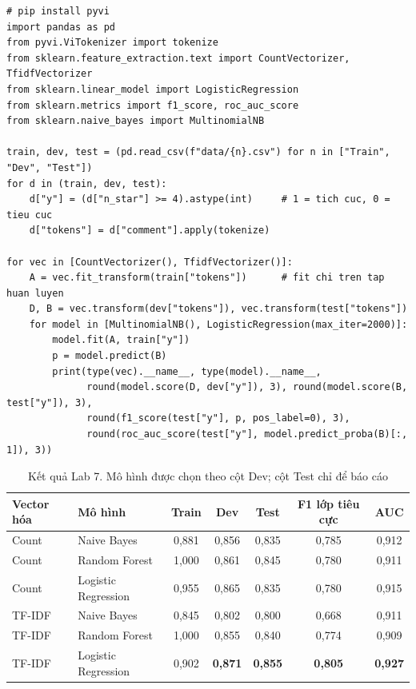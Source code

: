 \begin{lstlisting}[caption={Lab 7 -- tách từ, vector hóa và so sánh mô hình}]
# pip install pyvi
import pandas as pd
from pyvi.ViTokenizer import tokenize
from sklearn.feature_extraction.text import CountVectorizer, TfidfVectorizer
from sklearn.linear_model import LogisticRegression
from sklearn.metrics import f1_score, roc_auc_score
from sklearn.naive_bayes import MultinomialNB

train, dev, test = (pd.read_csv(f"data/{n}.csv") for n in ["Train", "Dev", "Test"])
for d in (train, dev, test):
    d["y"] = (d["n_star"] >= 4).astype(int)     # 1 = tich cuc, 0 = tieu cuc
    d["tokens"] = d["comment"].apply(tokenize)

for vec in [CountVectorizer(), TfidfVectorizer()]:
    A = vec.fit_transform(train["tokens"])      # fit chi tren tap huan luyen
    D, B = vec.transform(dev["tokens"]), vec.transform(test["tokens"])
    for model in [MultinomialNB(), LogisticRegression(max_iter=2000)]:
        model.fit(A, train["y"])
        p = model.predict(B)
        print(type(vec).__name__, type(model).__name__,
              round(model.score(D, dev["y"]), 3), round(model.score(B, test["y"]), 3),
              round(f1_score(test["y"], p, pos_label=0), 3),
              round(roc_auc_score(test["y"], model.predict_proba(B)[:, 1]), 3))
\end{lstlisting}

\begin{table}[H]
\centering
\begin{tabular}{|l|l|c|c|c|c|c|}
\hline
\textbf{Vector hóa} & \textbf{Mô hình} & \textbf{Train} & \textbf{Dev} & \textbf{Test} & \textbf{F1 lớp tiêu cực} & \textbf{AUC} \\
\hline
Count & Naive Bayes & 0,881 & 0,856 & 0,835 & 0,785 & 0,912 \\ \hline
Count & Random Forest & 1,000 & 0,861 & 0,845 & 0,780 & 0,911 \\ \hline
Count & Logistic Regression & 0,955 & 0,865 & 0,835 & 0,780 & 0,915 \\ \hline
TF-IDF & Naive Bayes & 0,845 & 0,802 & 0,800 & 0,668 & 0,911 \\ \hline
TF-IDF & Random Forest & 1,000 & 0,855 & 0,840 & 0,774 & 0,909 \\ \hline
TF-IDF & Logistic Regression & 0,902 & \textbf{0,871} & \textbf{0,855} & \textbf{0,805} & \textbf{0,927} \\ \hline
\end{tabular}
\caption{Kết quả Lab 7. Mô hình được chọn theo cột Dev; cột Test chỉ để báo cáo}
\label{tab:lab-sentiment}
\end{table}

